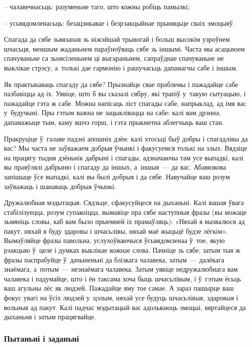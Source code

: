 – чалавечнасьць: разуменьне таго, што кожны робіць памылкі;

– усьвядомленасьць: безацэнкавае і безрэакцыйнае прыняцьце сваіх эмоцыяў.

Спагада да сябе зьвязаная зь ніжэйшай трывогай і больш высокім узроўнем шчасьця, меншым жаданьнем параўноўваць сябе зь іншымі. Часта мы асацыюем спачуваньне са зьнясіленьнем ці выгараньнем, сапраўднае спачуваньне не выклікае стрэсу, а~толькі дае гармонію і рашучасьць дапамагчы сабе і іншым.

Як практыкаваць спагаду да сябе? Прызнайце свае праблемы і пажадайце сабе пазбавіцца ад іх. Уявіце, што б вы сказалі сябру, які трапіў у~такую сытуацыю, і пажадайце гэта ж сабе. Можна напісаць ліст спагады сабе, напрыклад, ад імя вас у~будучыні. Пры гэтым важна не зацыклівацца на сабе: калі вам дрэнна, дапамажыце тым, каму яшчэ горш, і гэта прыкметна аблегчыць ваш стан.

Пракруціце ў~галаве падзеі апошніх дзён: калі хтосьці быў добры і спагадлівы да вас? Мы часта не заўважаем добрыя ўчынкі і факусуемся толькі на злых. Вядзіце на працягу тыдня дзёньнік дабрыні і спагады, адзначаючы там усе выпадкі, калі вы праяўлялі дабрыню і спагаду да іншых, а~іншыя~--- да вас. Абавязкова запішыце ўсе выпадкі, калі вы былі добрыя і да сябе. Навучайце ваш розум заўважаць і шанаваць добрыя ўчынкі.

Дружалюбная мэдытацыя. Сядзьце, сфакусуйцеся на дыханьні. Калі вашая ўвага стабілізуецца, розум супакоіцца, вымавіце пра сябе наступныя фразы (вы можаце зьмяніць словы, каб вам было прыемней іх прамаўляць): «Няхай я вызвалюся ад пакут, няхай я буду здаровы і шчасьлівы, няхай маё жыцьцё будзе лёгкім». Вымаўляйце фразы павольна, услухоўваючыся ўсьвядомленаа ў~тое, якую рэакцыю ў~целе і думках выклікае кожнае слова. Пачніце зь сябе, затым тыя ж фразы паспрабуйце ў~дачыненьні да блізкага чалавека, затым~--- далёкага знаёмага, а~потым~--- незнаёмага чалавека. Затым уявіце недружалюбнага вам чалавека і падумайце, што і ён таксама хоча быць шчасьлівым, і ў~гэтым ёсьць ваш агульны лёс як людзей. Пажадайце яму тое самае. А зараз пашырце ваш фокус увагі на ўсіх людзей у~цэлым, няхай усе будуць шчасьлівыя, здаровыя і вольныя ад пакут. Калі падчас мэдытацый вас адольваюць эмоцыі, вяртайцеся да дыханьня і затым працягвайце.

\subsubsection{Пытаньні і заданьні}

